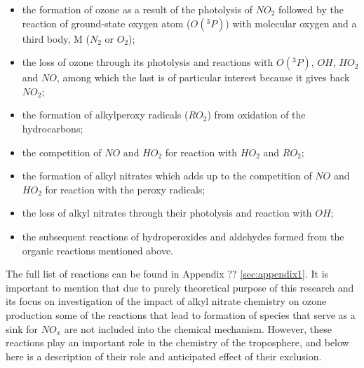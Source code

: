 \documentclass[11pt,a4paper]{article}
\begin{document}
\begin{itemize}
\item the formation of ozone as a result of the photolysis of $NO_2$ followed by the reaction of ground-state oxygen atom ($O(^3P)$) with molecular oxygen and a third body, M ($N_2$ or $O_2$);
\item the loss of ozone through its photolysis and reactions with $O(^3P)$, $OH$, $HO_2$ and $NO$, among which the last is of particular interest because it gives back $NO_2$;
\item the formation of alkylperoxy radicals ($RO_2$) from oxidation of the hydrocarbons;
\item the competition of $NO$ and $HO_2$ for reaction with $HO_2$ and $RO_2$;
\item the formation of alkyl nitrates which adds up to the competition of $NO$ and $HO_2$ for reaction with the peroxy radicals;
\item the loss of alkyl nitrates through their photolysis and reaction with $OH$;
\item the subsequent reactions of hydroperoxides and aldehydes formed from the organic reactions mentioned above.
\end{itemize}
The full list of reactions can be found in Appendix ?? \ref{sec:appendix1}. It is important to mention that due to purely theoretical purpose of this research and its focus on investigation of the impact of alkyl nitrate chemistry on ozone production some of the reactions that lead to formation of species that serve as a sink for $NO_x$ are not included into the chemical mechanism. However, these reactions play an important role in the chemistry of the troposphere, and below here is a description of their role and anticipated effect of their exclusion.
\end{document}
